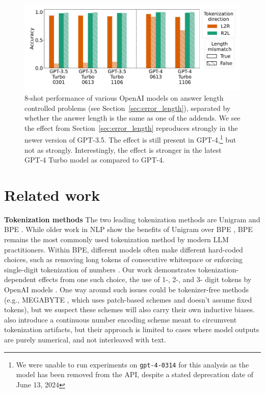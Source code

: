 \documentclass{article}
\theoremstyle{plain}
\theoremstyle{definition}
\theoremstyle{remark}
\begin{document}
\begin{figure}
    \centering
    \includegraphics[width=\columnwidth]{figures/accuracy_diff_len_match_fourcol_v2.pdf}
    \vspace{-2.5em}
    \caption{8-shot performance of various OpenAI models on answer length controlled problems (see Section~\ref{sec:error_length}), separated by whether the answer length is the same as one of the addends. We see the effect from Section~\ref{sec:error_length} reproduces strongly in the newer version of GPT-3.5. The effect is still present in GPT-4,\footnote{We were unable to run experiments on \texttt{gpt-4-0314} for this analysis as the model has been removed from the API, despite a stated deprecation date of June 13, 2024} but not as strongly. Interestingly, the effect is stronger in the latest GPT-4 Turbo model as compared to GPT-4.}
    \vspace{-1.5em}
    \label{fig:error_new_models}
\end{figure}

\section{Related work}
\label{sec:related_work}

\textbf{Tokenization methods} The two leading tokenization methods are Unigram \cite{kudo2018unigram} and BPE \cite{sennrich2016bpe}. While older work in NLP show the benefits of Unigram over BPE \cite{bostrom2020bpe}, BPE remains the most commonly used tokenization method by modern LLM practitioners. Within BPE, different models often make different hard-coded choices, such as removing long tokens of consecutive whitespace \cite{touvron2023llama1} or enforcing single-digit tokenization of numbers \cite{chowdhery2022palm}. Our work demonstrates tokenization-dependent effects from one such choice, the use of 1-, 2-, and 3- digit tokens by OpenAI models \cite{openai2023gpt4}. One way around such issues could be tokenizer-free methods (e.g., MEGABYTE \cite{yu2023megabyte}, which uses patch-based schemes and doesn't assume fixed tokens), but we suspect these schemes will also carry their own inductive biases. \citet{golkar2023xval} also introduce a continuous number encoding scheme meant to circumvent tokenization artifacts, but their approach is limited to cases where model outputs are purely numerical, and not interleaved with text.
\end{document}
